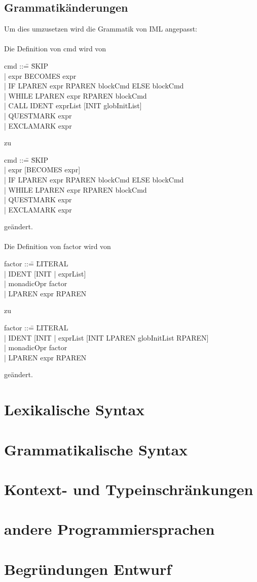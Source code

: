 \documentclass[a4paper,10pt]{article}
\begin{document}
\subsection{Grammatik\"anderungen}
Um dies umzusetzen wird die Grammatik von IML angepasst:\\\\
Die Definition von cmd wird von
\begin{tabbing}
cmd ::\= = \= SKIP\\
\> |\> expr BECOMES expr\\
\> |\> IF LPAREN expr RPAREN blockCmd ELSE blockCmd\\
\> |\> WHILE LPAREN expr RPAREN blockCmd\\
\> |\> CALL IDENT exprList [INIT globInitList]\\
\> |\> QUESTMARK expr\\
\> |\> EXCLAMARK expr\\
\end{tabbing}
zu
\begin{tabbing}
cmd ::\= = \= SKIP\\
\> |\> expr [BECOMES expr]\\
\> |\> IF LPAREN expr RPAREN blockCmd ELSE blockCmd\\
\> |\> WHILE LPAREN expr RPAREN blockCmd\\
\> |\> QUESTMARK expr\\
\> |\> EXCLAMARK expr\\
\end{tabbing}
ge\"andert.\\\\
Die Definition von factor wird von
\begin{tabbing}
factor ::\= = \= LITERAL\\
\> |\> IDENT [INIT | exprList]\\
\> |\> monadicOpr factor\\
\> |\> LPAREN expr RPAREN\\
\end{tabbing}
zu
\begin{tabbing}
factor ::\= = \= LITERAL\\
\> |\> IDENT [INIT | exprList [INIT LPAREN globInitList RPAREN]\\
\> |\> monadicOpr factor\\
\> |\> LPAREN expr RPAREN\\
\end{tabbing}
ge\"andert.
\section{Lexikalische Syntax}
\section{Grammatikalische Syntax}
\section{Kontext- und Typeinschr\"ankungen}
\section{andere Programmiersprachen}
\section{Begr\"undungen Entwurf}
\end{document}
